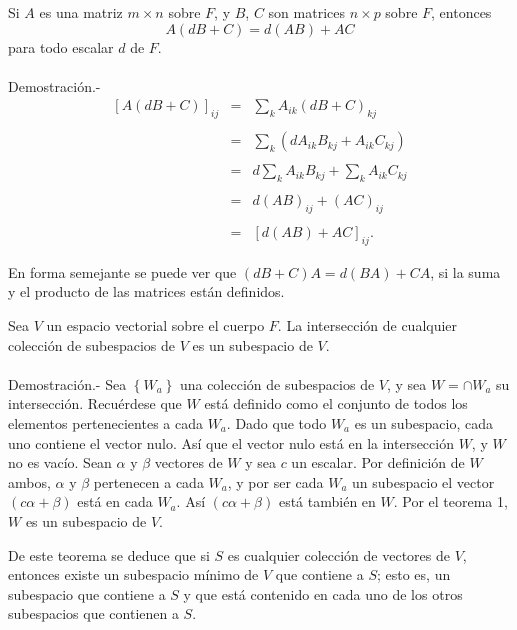 \begin{lema}
    Si $A$ es una matriz $m\times n$ sobre $F$, y $B$, $C$ son matrices $n\times p$ sobre $F$, entonces
    \begin{equation}
	A(dB+C)=d(AB)+AC
    \end{equation}
    para todo escalar $d$ de $F$.\\\\
	Demostración.-\;
	$$
	\begin{array}{rcl}
	    \left[A(dB+C)\right]_{ij}&=&\displaystyle\sum_k A_{ik}(dB+C)_{kj}\\\\
				     &=&\displaystyle\sum_k \left(dA_{ik}B_{kj}+A_{ik}C_{kj}\right)\\\\
				     &=& d\displaystyle\sum_k A_{ik}B_{kj} + \sum_{k} A_{ik} C_{kj}\\\\
				     &=& d(AB)_{ij} + (AC)_{ij}\\\\
				     &=& \left[d(AB) + AC\right]_{ij}.
	\end{array}
	$$
\end{lema}

En forma semejante se puede ver que $(dB+C)A=d(BA)+CA$, si la suma y el producto de las matrices están definidos.

\begin{teo}
    Sea $V$ un espacio vectorial sobre el cuerpo $F$. La intersección de cualquier colección de subespacios de $V$ es un subespacio de $V$.\\\\
	Demostración.-\; Sea $\left\{W_a\right\}$ una colección de subespacios de $V$, y sea $W=\cap W_a$ su intersección. Recuérdese que $W$ está definido como el conjunto de todos los elementos pertenecientes a cada $W_a$. Dado que todo $W_a$ es un subespacio, cada uno contiene el vector nulo. Así que el vector nulo está en la intersección $W$, y $W$ no es vacío. Sean $\alpha$ y $\beta$ vectores de $W$ y sea $c$ un escalar. Por definición de $W$ ambos,  $\alpha$ y $\beta$ pertenecen a cada $W_a$, y por ser cada $W_a$ un subespacio el vector $(c\alpha+\beta)$ está en cada $W_a$. Así $(c\alpha+\beta)$ está también en $W$. Por el teorema 1, $W$ es un subespacio de $V$. 
\end{teo}

De este teorema se deduce que si $S$ es cualquier colección de vectores de $V$, entonces existe un subespacio mínimo de $V$ que contiene a $S$; esto es, un subespacio que contiene a $S$ y que está contenido en cada uno de los otros subespacios que contienen a $S$.


